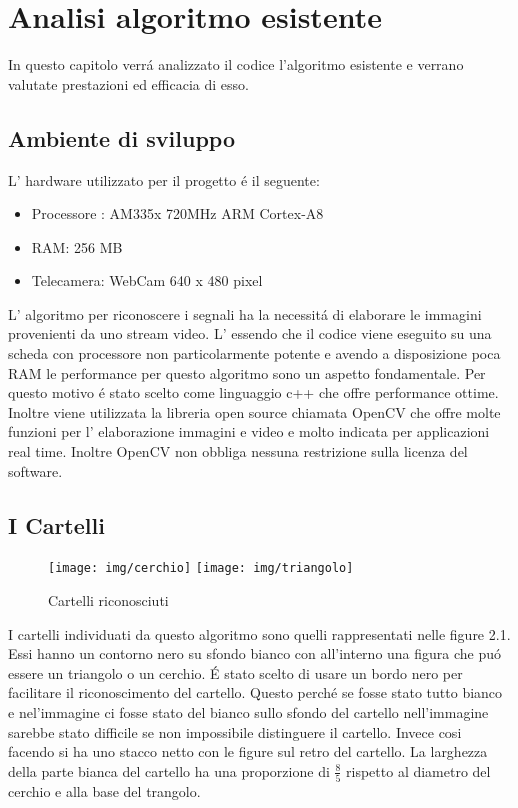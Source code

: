 \chapter{Analisi algoritmo esistente}

In questo capitolo verr\'a analizzato il codice l'algoritmo esistente e verrano valutate prestazioni ed efficacia di esso.


\section{Ambiente di sviluppo}

	L' hardware utilizzato per il progetto \'e il seguente:
	\begin{itemize}
	\item Processore : AM335x 720MHz ARM Cortex-A8
	\item RAM: 256 MB
	\item Telecamera: WebCam 640 x 480 pixel
	\end{itemize}

	L' algoritmo per riconoscere i segnali ha la necessit\'a di elaborare le immagini provenienti da uno stream video. L' essendo che il codice viene eseguito su una scheda con processore non particolarmente potente e avendo a disposizione poca RAM le performance per questo algoritmo sono un aspetto fondamentale. Per questo motivo \'e stato scelto come linguaggio c++ che offre performance ottime. Inoltre viene utilizzata la libreria open source chiamata OpenCV che offre molte funzioni per l' elaborazione immagini e video e molto indicata per applicazioni real time. Inoltre OpenCV non obbliga nessuna restrizione sulla licenza del software.


\section{I Cartelli}
	\begin{figure}[!ht]
		\centering
		\texttt{[image: img/cerchio]}
		\texttt{[image: img/triangolo]}
		\caption{Cartelli riconosciuti}
	\end{figure}
	I cartelli individuati da questo algoritmo sono quelli rappresentati nelle figure 2.1.
	Essi hanno un contorno nero su sfondo bianco con all'interno una figura che pu\'o essere un triangolo o un cerchio.
	\'E stato scelto di usare un bordo nero per facilitare il riconoscimento del cartello. Questo perch\'e se fosse stato tutto bianco e nel'immagine ci fosse stato del bianco sullo sfondo del cartello nell'immagine sarebbe stato difficile se non impossibile distinguere il cartello. Invece cosi facendo si ha uno stacco netto con le figure sul retro del cartello. La larghezza della parte bianca del cartello ha una proporzione di $\tfrac{8}{5}$ rispetto al diametro del cerchio e alla base del trangolo.

